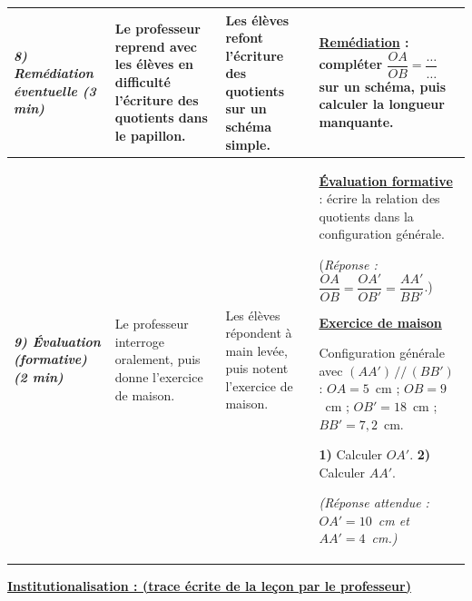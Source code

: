 \documentclass[10pt]{article}
\newcommand{\titreR}[1]{\underline{\textcolor{rougetitre}{\bfseries #1}}}
\newcommand{\maison}{\underline{\textcolor{rougemaison}{\bfseries Exercice de maison}}}
\newcommand{\moment}[1]{\textbf{\itshape #1}}
\begin{document}
\begin{longtable}{|p{2.35cm}|p{5.35cm}|p{4.55cm}|p{13.85cm}|}
\moment{8) Remédiation éventuelle (3 min)} &
Le professeur reprend avec les élèves en difficulté  l'écriture des quotients dans le papillon. &
Les élèves refont  l'écriture des quotients sur un schéma simple. &
\titreR{Remédiation} : compléter $\dfrac{OA}{OB}=\dfrac{\dots}{\dots}$ sur un
schéma, puis calculer la longueur manquante. \\ \hline

\moment{9) Évaluation (formative) (2 min)} &
Le professeur interroge oralement, puis donne l'exercice de maison. &
Les élèves répondent à main levée, puis notent l'exercice de maison. &
\titreR{Évaluation formative} : écrire la relation des quotients dans la
configuration générale. \par
(\textit{Réponse : $\dfrac{OA}{OB}=\dfrac{OA'}{OB'}=\dfrac{AA'}{BB'}$}.) \par
\maison \par
Configuration générale avec $(AA')\,//\,(BB')$ : $OA=5$~cm ; $OB=9$~cm ;
$OB'=18$~cm ; $BB'=7{,}2$~cm. \par
\textbf{1)} Calculer $OA'$. \quad \textbf{2)} Calculer $AA'$. \par
\textit{(Réponse attendue : $OA'=10$~cm et $AA'=4$~cm.)} \\ \hline
\end{longtable}

\begin{center}
\underline{\textcolor{rougetitre}{\large\bfseries Institutionalisation \; : \; (trace écrite de la leçon par le professeur)}}
\end{center}
\end{document}
